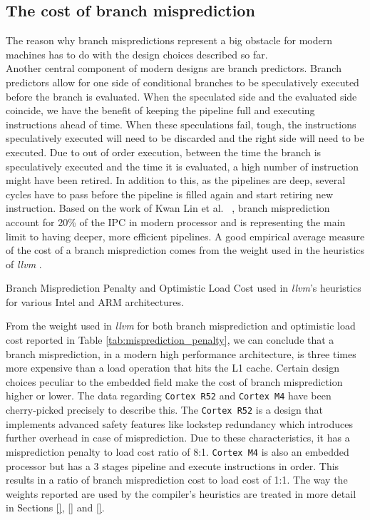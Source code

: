 \subsection{The cost of branch misprediction}
\label{sec:costo_of_branch_prediction}
The reason why branch mispredictions represent a big obstacle for modern machines has to do with the design choices described so far. \\
Another central component of modern designs are branch predictors. Branch predictors allow for one side of conditional branches to be speculatively executed before the branch is evaluated. When the speculated side and the evaluated side coincide, we have the benefit of keeping the pipeline full and executing instructions ahead of time. When these speculations fail, tough, the instructions speculatively executed will need to be discarded and the right side will need to be executed. Due to out of order execution, between the time the branch is speculatively executed and the time it is evaluated, a high number of instruction might have been retired. In addition to this, as the pipelines are deep, several cycles have to pass before the pipeline is filled again and start retiring new instruction.
Based on the work of Kwan Lin et al. ~\cite{lin2019branch}, branch misprediction account for 20\% of the IPC in modern processor and is representing the main limit to having deeper, more efficient pipelines. A good empirical average measure of the cost of a branch misprediction comes from the weight used in the heuristics of  \textit{llvm} \cite{Lattner2004LLVM}.

\begin{table}[H]
    \captionsetup{type=table}
    \centering
    
    \caption[Branch Misprediction Penalty]{Branch Misprediction Penalty and Optimistic Load Cost used in \textit{llvm}'s heuristics for various Intel and ARM architectures.}
    \label{tab:misprediction_penalty}
\end{table}

From the weight used in \textit{llvm} for both branch misprediction and optimistic load cost reported in Table \ref{tab:misprediction_penalty}, we can conclude that a branch misprediction, in a modern high performance architecture, is three times more expensive than a load operation that hits the L1 cache. Certain design choices peculiar to the embedded field make the cost of branch misprediction higher or lower. The data regarding \texttt{Cortex R52} and \texttt{Cortex M4} have been cherry-picked precisely to describe this. The \texttt{Cortex R52} is a design that implements advanced safety features like lockstep redundancy which introduces further overhead in case of misprediction. Due to these characteristics, it has a misprediction penalty to load cost ratio of 8:1. \texttt{Cortex M4} is also an embedded processor but has a 3 stages pipeline and execute instructions in order. This results in a ratio of branch misprediction cost to load cost of 1:1.
The way the weights reported are used by the compiler's heuristics are treated in more detail in Sections \ref{}, \ref{} and \ref{}.

